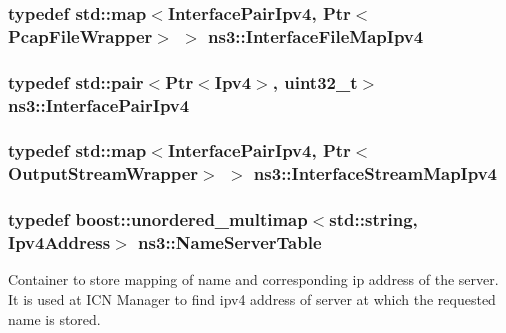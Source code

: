 \hypertarget{namespacens3_ab14a5629528234e6f76ad3bb180022fe}{
\subsubsection[{Interface\-File\-Map\-Ipv4}]{\setlength{\rightskip}{0pt plus 5cm}typedef std\-::map$<${\bf Interface\-Pair\-Ipv4}, Ptr$<$Pcap\-File\-Wrapper$>$ $>$ {\bf ns3\-::\-Interface\-File\-Map\-Ipv4}}}\label{namespacens3_ab14a5629528234e6f76ad3bb180022fe}
\hypertarget{namespacens3_a83e2603870381affabd5ca766d17daff}{
\subsubsection[{Interface\-Pair\-Ipv4}]{\setlength{\rightskip}{0pt plus 5cm}typedef std\-::pair$<$Ptr$<$Ipv4$>$, uint32\-\_\-t$>$ {\bf ns3\-::\-Interface\-Pair\-Ipv4}}}\label{namespacens3_a83e2603870381affabd5ca766d17daff}
\hypertarget{namespacens3_a5634ac4e27d952132fba4cd906d4ebd3}{
\subsubsection[{Interface\-Stream\-Map\-Ipv4}]{\setlength{\rightskip}{0pt plus 5cm}typedef std\-::map$<${\bf Interface\-Pair\-Ipv4}, Ptr$<$Output\-Stream\-Wrapper$>$ $>$ {\bf ns3\-::\-Interface\-Stream\-Map\-Ipv4}}}\label{namespacens3_a5634ac4e27d952132fba4cd906d4ebd3}
\hypertarget{namespacens3_a30b2bc59285e3015fedd6268c6f77947}{
\subsubsection[{Name\-Server\-Table}]{\setlength{\rightskip}{0pt plus 5cm}typedef boost\-::unordered\-\_\-multimap$<$std\-::string, Ipv4\-Address$>$ {\bf ns3\-::\-Name\-Server\-Table}}}\label{namespacens3_a30b2bc59285e3015fedd6268c6f77947}


Container to store mapping of name and corresponding ip address of the server. It is used at I\-C\-N Manager to find ipv4 address of server at which the requested name is stored. 

